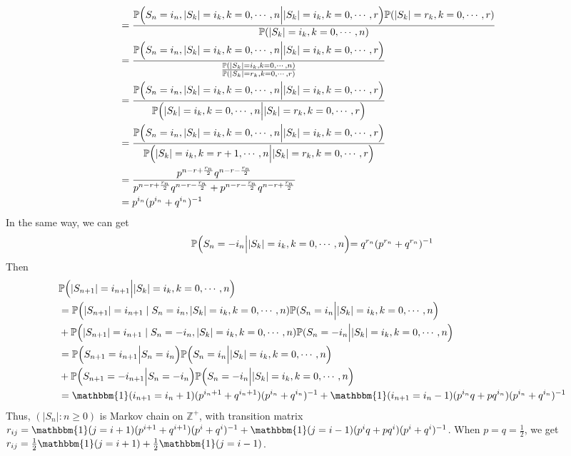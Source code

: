 \documentclass{ctexart}
\begin{document}
\begin{solution}
\begin{enumerate}
\[\begin{aligned}
          \\                                & =          \frac{\mathbb{P}\Bigl(S_{n}=i_n,|S_k|=i_k,k=0,\cdots,n\Bigl| |S_k|=i_k,k=0,\cdots,r\Bigl)\mathbb{P}(|S_k|=r_k,k=0,\cdots,r)}{\mathbb{P}(|S_k|=i_k,k=0,\cdots,n)}
          \\                                & =          \frac{\mathbb{P}\Bigl(S_{n}=i_n,|S_k|=i_k,k=0,\cdots,n\Bigl| |S_k|=i_k,k=0,\cdots,r\Bigl)}{\frac{\mathbb{P}(|S_k|=i_k,k=0,\cdots,n)}{\mathbb{P}(|S_k|=r_k,k=0,\cdots,r)}}
          \\                                & =          \frac{\mathbb{P}\Bigl(S_{n}=i_n,|S_k|=i_k,k=0,\cdots,n\Bigl||S_k|=i_k,k=0,\cdots,r\Bigl)}{\mathbb{P}\Bigl(|S_k|=i_k,k=0,\cdots,n\Bigl| |S_k|=r_k,k=0,\cdots,r\Bigl)}
          \\                                & =          \frac{\mathbb{P}\Bigl(S_{n}=i_n,|S_k|=i_k,k=0,\cdots,n\Bigl||S_k|=i_k,k=0,\cdots,r\Bigl)}{\mathbb{P}\Bigl(|S_k|=i_k,k=r + 1,\cdots,n\Bigl| |S_k|=r_k,k=0,\cdots,r\Bigl)}
          \\                                & =\frac{p^{n - r + \frac{r_n}{2}}q^{n-r - \frac{r_n}{2}}}{p^{n - r + \frac{r_n}{2}}q^{n-r - \frac{r_n}{2}}+p^{n - r - \frac{r_n}{2}}q^{n-r + \frac{r_n}{2}}}
          \\&=p^{i_n}(p^{i_n}+q^{i_n})^{-1}
        \end{aligned}
      \]
      In the same way, we can get
      \[
        \mathbb{P}\Bigl(S_{n}=-i_n\Bigl|  |S_k|=i_k,k=0,\cdots,n\Bigl)=q^{r_n}(p^{r_n}+q^{r_n})^{-1}
      \]
      Then
      \[
        \begin{aligned}
           & \mathbb{P}\Bigl(|S_{n + 1}|=i_{n + 1}\Bigl|  |S_k|=i_k,k=0,\cdots,n\Bigl)
          \\                     & =          \mathbb{P}\Bigl(|S_{n + 1}|=i_{n + 1}\mid S_n=i_n ,|S_k|=i_k,k=0,\cdots,n)\mathbb{P}(S_n=i_n \Bigl| |S_k|=i_k,k=0,\cdots,n\Bigl)
          \\                   & +\mathbb{P}\Bigl(|S_{n + 1}|=i_{n + 1}\mid S_n=-i_n ,|S_k|=i_k,k=0,\cdots,n)\mathbb{P}(S_n=-i_n \Bigl| |S_k|=i_k,k=0,\cdots,n\Bigl)
          \\                   & =\mathbb{P}\Bigl(S_{n + 1}=i_{n + 1}\Bigl|S_n=i_n\Bigl) \mathbb{P}\Bigl(S_n=i_n \Bigl| |S_k|=i_k,k=0,\cdots,n\Bigl)
          \\                   & +\mathbb{P}\Bigl(S_{n + 1}=-i_{n + 1}\Bigl|S_n=-i_n\Bigl) \mathbb{P}\Bigl(S_n=-i_n \Bigl| |S_k|=i_k,k=0,\cdots,n\Bigl)
          \\ &=\mathbbm{1}(i_{n + 1}=i_n +1)(p^{i_n + 1} +q^{i_n + 1})(p^{i_n} + q^{i_n})^{-1} + \mathbbm{1}(i_{n + 1}=i_n-1)(p^{i_n}q +pq^{i_n })(p^{i_n} + q^{i_n})^{-1}
        \end{aligned}
      \]
      Thus, \((|S_n|:n \geq 0)\) is Markov chain on \(\mathbb{Z}^+\), with transition matrix
      \(r_{ij}=\mathbbm{1}(j=i +1)(p^{i + 1} +q^{i + 1})(p^{i} + q^{i})^{-1} + \mathbbm{1}(j=i-1)(p^{i}q +pq^{i })(p^{i} + q^{i})^{-1}\).
      When \(p=q=\frac{1}{2}\), we get \(r_{ij}=\frac{1}{2}\mathbbm{1}(j=i+1) + \frac{1}{2}\mathbbm{1}(j=i - 1)\).
  \end{enumerate}

\end{solution}
\end{document}

